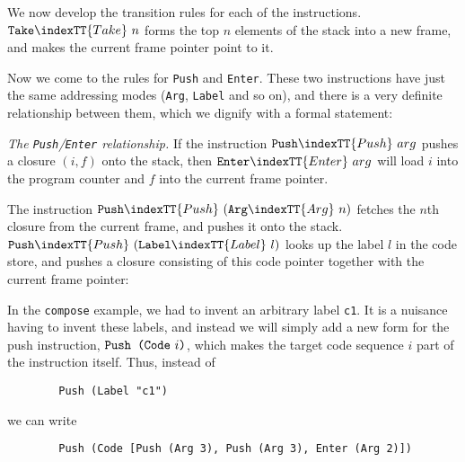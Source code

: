 We now develop the transition rules for each of the instructions.
$\mbox{\tt Take}\indexTT{Take}~ n$ forms the top $n$ elements of the stack into a new frame, and
makes the current frame pointer point to it.
 \label{rule:take}

Now we come to the rules for \mbox{\tt Push} and \mbox{\tt Enter}.  These two instructions
have just the same addressing modes
(\mbox{\tt Arg}, \mbox{\tt Label} and so on), and
there is a very definite relationship between them,
which we dignify with a formal statement:
\begin{important}
{\em The \mbox{\tt Push}/\mbox{\tt Enter} relationship.}
If the instruction $\mbox{\tt Push}\indexTT{Push}~arg$ pushes a closure $(i,f)$ onto the stack,
then $\mbox{\tt Enter}\indexTT{Enter}~arg$ will load $i$ into the program counter and $f$ into
the current frame pointer.
\end{important}
The instruction
$\mbox{\tt Push}\indexTT{Push}~(\mbox{\tt Arg}\indexTT{Arg}~ n)$ fetches the $n$th closure from the current frame, and
pushes it onto the stack.
$\mbox{\tt Push}\indexTT{Push}~(\mbox{\tt Label}\indexTT{Label}~ l)$ looks up the label $l$ in the code store, and
pushes a closure consisting of this code pointer together with the
current frame pointer:

In the \mbox{\tt compose} example, we had to invent an arbitrary label \mbox{\tt c1}.
It is a nuisance having to invent these labels, and instead we will
simply
add a new form for the push instruction, $\mbox{\tt Push\ (Code}~i\mbox{\tt )}$, which makes the
target code sequence $i$ part of the instruction itself.
Thus, instead of
\begin{verbatim}
        Push (Label "c1")
\end{verbatim}
we can write
\begin{verbatim}
        Push (Code [Push (Arg 3), Push (Arg 3), Enter (Arg 2)])
\end{verbatim}

